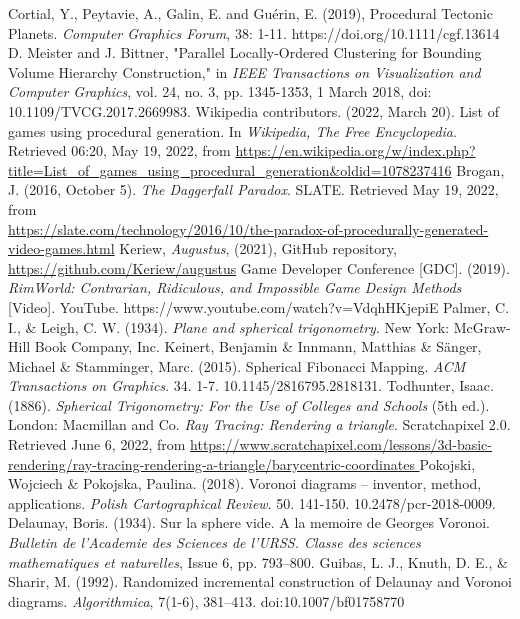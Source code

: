 \begin{thebibliography}{9}
Cortial, Y., Peytavie, A., Galin, E. and Guérin, E. (2019), Procedural Tectonic Planets. \textit{Computer Graphics Forum}, 38: 1-11. https://doi.org/10.1111/cgf.13614
D. Meister and J. Bittner, "Parallel Locally-Ordered Clustering for Bounding Volume Hierarchy Construction," in \textit{IEEE Transactions on Visualization and Computer Graphics}, vol. 24, no. 3, pp. 1345-1353, 1 March 2018, doi: 10.1109/TVCG.2017.2669983.
Wikipedia contributors. (2022, March 20). List of games using procedural generation. In \textit{Wikipedia, The Free Encyclopedia}. Retrieved 06:20, May 19, 2022, from \url{https://en.wikipedia.org/w/index.php?title=List\_of\_games\_using\_procedural\_generation\&oldid=1078237416}
Brogan, J. (2016, October 5). \textit{The Daggerfall Paradox}. SLATE. Retrieved May 19, 2022, from\\ \url{https://slate.com/technology/2016/10/the-paradox-of-procedurally-generated-video-games.html}
Keriew, \textit{Augustus}, (2021), GitHub repository, \url{https://github.com/Keriew/augustus}
Game Developer Conference [GDC]. (2019). \textit{RimWorld: Contrarian, Ridiculous, and Impossible Game Design Methods} [Video]. YouTube. https://www.youtube.com/watch?v=VdqhHKjepiE
Palmer, C. I., \& Leigh, C. W. (1934). \textit{Plane and spherical trigonometry}. New York: McGraw-Hill Book Company, Inc. 
Keinert, Benjamin  \& Innmann, Matthias \& Sänger, Michael \& Stamminger, Marc. (2015). Spherical Fibonacci Mapping. \textit{ACM Transactions on Graphics}. 34. 1-7. 10.1145/2816795.2818131. 
Todhunter, Isaac. (1886). \textit{Spherical Trigonometry: For the Use of Colleges and Schools} (5th ed.). London: Macmillan and Co.
\textit{Ray Tracing: Rendering a triangle}. Scratchapixel 2.0. Retrieved June 6, 2022, from \url{https://www.scratchapixel.com/lessons/3d-basic-rendering/ray-tracing-rendering-a-triangle/barycentric-coordinates }
Pokojski, Wojciech \& Pokojska, Paulina. (2018). Voronoi diagrams – inventor, method, applications. \textit{Polish Cartographical Review}. 50. 141-150. 10.2478/pcr-2018-0009. 
 Delaunay, Boris. (1934). Sur la sphere vide. A la memoire de Georges Voronoi. \textit{Bulletin de l’Academie des Sciences de l’URSS. Classe des sciences mathematiques et naturelles}, Issue 6, pp. 793–800.
 Guibas, L. J., Knuth, D. E., \& Sharir, M. (1992). Randomized incremental construction of Delaunay and Voronoi diagrams. \textit{Algorithmica}, 7(1-6), 381–413. doi:10.1007/bf01758770 

\end{thebibliography}
